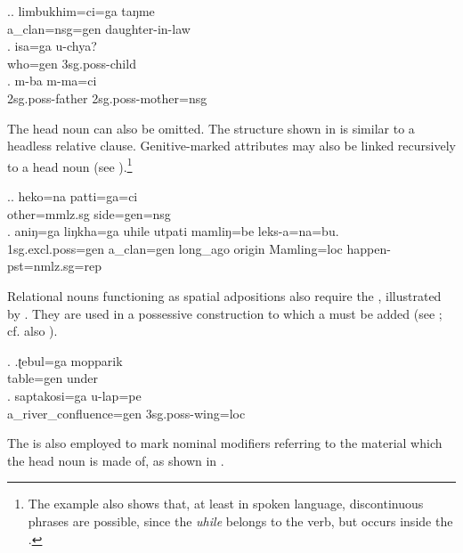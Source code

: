 		\ex.\ag. limbukhim=ci=ga       taŋme\\
		a\_clan{\sc =nsg=gen} daughter-in-law\\
 
	\bg. isa=ga u-chya?\\
	who{\sc =gen} {\sc 3sg.poss-}child\\
		\bg. m-ba m-ma=ci\\
		{\sc 2sg.poss-}father {\sc 2sg.poss-}mother{\sc =nsg}	\\
	
The head noun can also be omitted. The  structure shown in \Next[a] is similar to a headless relative clause. Genitive-marked attributes may also  be linked recursively to a head noun (see \Next[b]).\footnote{The example also shows that, at least in spoken language, discontinuous phrases are possible, since the  \emph{uhile} belongs to the verb, but occurs inside the .}



\ex.\ag. heko=na    patti=ga=ci\\
		other{\sc =mmlz.sg} side{\sc =gen=nsg}	\\
	 
	\bg. aniŋ=ga liŋkha=ga uhile utpati mamliŋ=be      leks-a=na=bu.\\
		{\sc 1sg.excl.poss=gen} a\_clan{\sc =gen} long\_ago origin Mamling{\sc =loc} happen{\sc [3sg]-pst=nmlz.sg=rep}\\
		  

Relational nouns functioning as spatial adpositions also require the , illustrated by \Next . They are used in a possessive construction to which a  must be added (see \Next[b]; cf. also ). 
	
\ex. \ag.ʈebul=ga mopparik\\
			table{\sc =gen} under\\
	\bg. saptakosi=ga u-lap=pe\\
		a\_river\_confluence{\sc =gen} {\sc 3sg.poss-}wing{\sc =loc}\\
	   

The  is also employed to mark nominal modifiers referring to the material which the head noun is made of, as shown in \Next.

